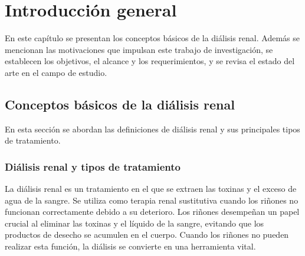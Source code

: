 
\chapter{Introducción general} %

\label{Chapter1} %
\label{IntroGeneral}


\newcommand{\keyword}[1]{\textbf{#1}}
\newcommand{\tabhead}[1]{\textbf{#1}}
\newcommand{\code}[1]{\texttt{#1}}
\newcommand{\file}[1]{\texttt{\bfseries#1}}
\newcommand{\option}[1]{\texttt{\itshape#1}}
\newcommand{\grados}{$^{\circ}$}





En este capítulo se presentan los conceptos básicos de la diálisis renal. Además se mencionan las motivaciones que impulsan este trabajo de investigación, se establecen los objetivos, el alcance y los requerimientos, y se revisa el estado del arte en el campo de estudio.

\section{Conceptos básicos de la diálisis renal}

En esta sección se abordan las definiciones de diálisis renal y sus principales tipos de tratamiento.

\subsection{Diálisis renal y tipos de tratamiento}

La diálisis renal es un tratamiento en el que se extraen las toxinas y el exceso de agua de la sangre. Se utiliza como terapia renal sustitutiva cuando los riñones no funcionan correctamente debido a su deterioro. Los riñones desempeñan un papel crucial al eliminar las toxinas y el líquido de la sangre, evitando que los productos de desecho se acumulen en el cuerpo. Cuando los riñones no pueden realizar esta función, la diálisis se convierte en una herramienta vital.

